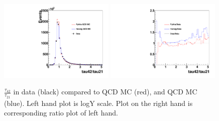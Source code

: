 \begin{figure}[htb]
\begin{center}
\includegraphics[width=0.49\textwidth,angle=0]{figs/SFExtra/SFSameJetRatioPlot.pdf}
\includegraphics[width=0.49\textwidth,angle=0]{figs/SFExtra/SFRatioRatioPlot.pdf}
\end{center}
\caption{
$\frac{\tau_{42}}{\tau_{21}}$ in data (black) compared to \PYTHIA QCD MC (red), and 
\HERWIG QCD MC (blue). Left hand plot is logY scale. Plot on the right hand is corresponding 
ratio plot of left hand.  
}
\label{fig:tau4221samejet}
\end{figure}

